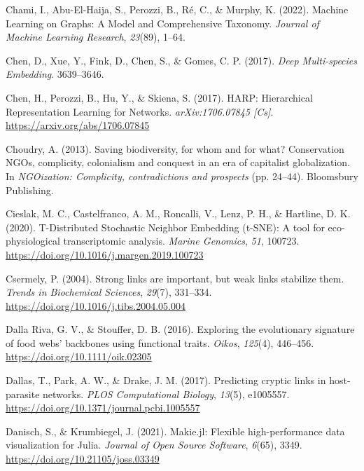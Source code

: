\documentclass[10pt,oneside]{article}
\newlength{\cslhangindent}
\newenvironment{CSLReferences}[2] %
 {%
  \setlength{\parindent}{0pt}
  \ifodd #1 \everypar{\setlength{\hangindent}{\cslhangindent}}\ignorespaces\fi
  \ifnum #2 > 0
  \setlength{\parskip}{#2\baselineskip}
  \fi
 }%
 {}
\begin{document}
\begin{CSLReferences}{1}{0}
\leavevmode{}%
Chami, I., Abu-El-Haija, S., Perozzi, B., Ré, C., \& Murphy, K. (2022).
Machine Learning on Graphs: A Model and Comprehensive Taxonomy.
\emph{Journal of Machine Learning Research}, \emph{23}(89), 1--64.

\leavevmode{}%
Chen, D., Xue, Y., Fink, D., Chen, S., \& Gomes, C. P. (2017).
\emph{Deep Multi-species Embedding}. 3639--3646.

\leavevmode{}%
Chen, H., Perozzi, B., Hu, Y., \& Skiena, S. (2017). HARP: Hierarchical
Representation Learning for Networks. \emph{arXiv:1706.07845 {[}Cs{]}}.
\url{https://arxiv.org/abs/1706.07845}

\leavevmode{}%
Choudry, A. (2013). Saving biodiversity, for whom and for what?
Conservation NGOs, complicity, colonialism and conquest in an era of
capitalist globalization. In \emph{NGOization: Complicity,
contradictions and prospects} (pp. 24--44). Bloomsbury Publishing.

\leavevmode{}%
Cieslak, M. C., Castelfranco, A. M., Roncalli, V., Lenz, P. H., \&
Hartline, D. K. (2020). T-Distributed Stochastic Neighbor Embedding
(t-SNE): A tool for eco-physiological transcriptomic analysis.
\emph{Marine Genomics}, \emph{51}, 100723.
\url{https://doi.org/10.1016/j.margen.2019.100723}

\leavevmode{}%
Csermely, P. (2004). Strong links are important, but weak links
stabilize them. \emph{Trends in Biochemical Sciences}, \emph{29}(7),
331--334. \url{https://doi.org/10.1016/j.tibs.2004.05.004}

\leavevmode{}%
Dalla Riva, G. V., \& Stouffer, D. B. (2016). Exploring the evolutionary
signature of food webs' backbones using functional traits. \emph{Oikos},
\emph{125}(4), 446--456. \url{https://doi.org/10.1111/oik.02305}

\leavevmode{}%
Dallas, T., Park, A. W., \& Drake, J. M. (2017). Predicting cryptic
links in host-parasite networks. \emph{PLOS Computational Biology},
\emph{13}(5), e1005557.
\url{https://doi.org/10.1371/journal.pcbi.1005557}

\leavevmode{}%
Danisch, S., \& Krumbiegel, J. (2021). Makie.jl: Flexible
high-performance data visualization for Julia. \emph{Journal of Open
Source Software}, \emph{6}(65), 3349.
\url{https://doi.org/10.21105/joss.03349}


\end{CSLReferences}
\end{document}

